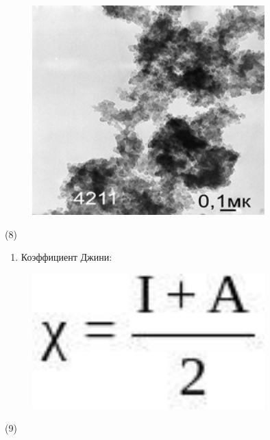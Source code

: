 \begin{figure}[H]
	\centering
	\includegraphics[width=0.8\textwidth]{assets/31}
	\caption*{}
\end{figure} (8)

\begin{enumerate}
\def\labelenumi{\arabic{enumi}.}
\setcounter{enumi}{1}
\item
  Коэффициент Джини:
\end{enumerate}

\begin{figure}[H]
	\centering
	\includegraphics[width=0.8\textwidth]{assets/32}
	\caption*{}
\end{figure} (9)

